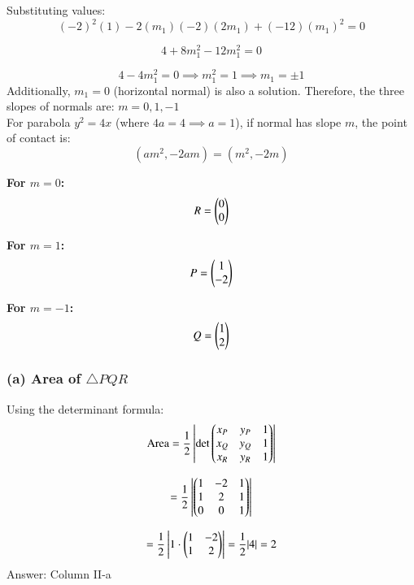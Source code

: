 \documentclass[article]{IEEEtran}
\begin{document}
Substituting values:
\begin{equation}
	(-2)^2(1) - 2(m_1)(-2)(2m_1) + (-12)(m_1)^2 = 0
\end{equation}

\begin{equation}
	4 + 8m_1^2 - 12m_1^2 = 0
\end{equation}

\begin{equation}
	4 - 4m_1^2 = 0 \implies m_1^2 = 1 \implies m_1 = \pm 1
\end{equation}
Additionally, $m_1 = 0$ (horizontal normal) is also a solution.
Therefore, the three slopes of normals are: $m = 0, 1, -1$\\
For parabola $y^2 = 4x$ (where $4a = 4 \implies a = 1$), if normal has slope $m$, the point of contact is:
\begin{equation}
	\left(am^2, -2am\right) = \left(m^2, -2m\right)
\end{equation}

\textbf{For $m = 0$:} 
\begin{equation}
	R = \begin{pmatrix}0\\0\end{pmatrix}
\end{equation}

\textbf{For $m = 1$:} 
\begin{equation}
	P = \begin{pmatrix}1\\-2\end{pmatrix}
\end{equation}

\textbf{For $m = -1$:} 
\begin{equation}
	Q = \begin{pmatrix}1\\2\end{pmatrix}
\end{equation}
\subsubsection*{(a) Area of $\triangle PQR$}
Using the determinant formula:
\begin{equation}
	\text{Area} = \frac{1}{2}\left|\det\begin{pmatrix}x_P & y_P & 1\\x_Q & y_Q & 1\\x_R & y_R & 1\end{pmatrix}\right|
\end{equation}

\begin{equation}
	= \frac{1}{2}\left|\begin{pmatrix}1 & -2 & 1\\1 & 2 & 1\\0 & 0 & 1\end{pmatrix}\right|
\end{equation}

\begin{equation}
	= \frac{1}{2}\left|1 \cdot\begin{pmatrix}1 & -2\\1 & 2\end{pmatrix}\right| = \frac{1}{2}|4| = 2
\end{equation}
Answer: Column II-a\\
\end{document}
